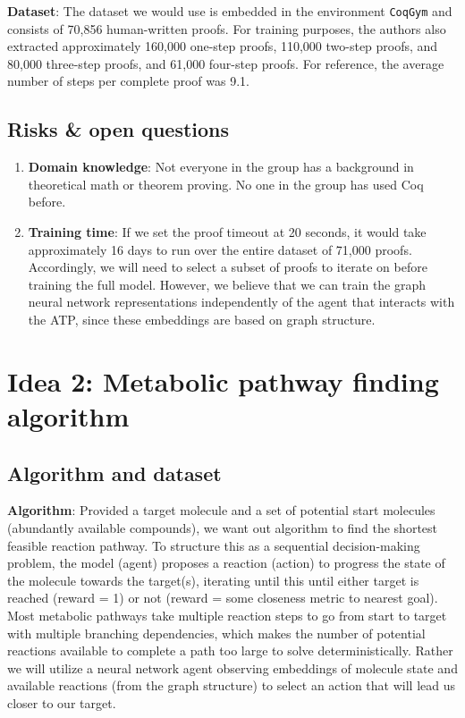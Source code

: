 \documentclass{article}
\begin{document}
\textbf{Dataset}: The dataset we would use is embedded in the environment
\texttt{CoqGym} and consists of 70,856 human-written proofs. For training
purposes, the authors also extracted approximately 160,000 one-step proofs,
110,000 two-step proofs, and 80,000 three-step proofs, and 61,000 four-step
proofs. For reference, the average number of steps per complete proof was 9.1.

\subsection{Risks \& open questions}
\begin{enumerate}
    \item \textbf{Domain knowledge}: Not everyone in the group has a background
      in theoretical math or theorem proving. No one in the group has used Coq
      before.
    \item \textbf{Training time}: If we set the proof timeout at 20 seconds, it would take approximately 16 days to run over the entire dataset of 71,000 proofs. Accordingly, we will need to select a subset of proofs to iterate on before training the full model. However, we believe that we can train the graph neural network representations independently of the agent that interacts with the ATP, since these embeddings are based on graph structure.
\end{enumerate}


\section{Idea 2: Metabolic pathway finding algorithm}
\subsection{Algorithm and dataset}
\textbf{Algorithm}: Provided a target molecule and a set of potential start molecules (abundantly available compounds), we want out algorithm to find the shortest feasible reaction pathway. To structure this as a sequential decision-making problem, the model (agent) proposes a reaction (action) to progress the state of the molecule towards the target(s), iterating until this until either target is reached (reward = 1) or not (reward = some closeness metric to nearest goal). Most metabolic pathways take multiple reaction steps to go from start to target with multiple branching dependencies, which makes the number of potential reactions available to complete a path too large to solve deterministically. Rather we will utilize a neural network agent observing embeddings of molecule state and available reactions (from the graph structure) to select an action that will lead us closer to our target.\\
\end{document}
